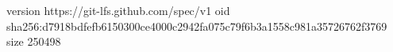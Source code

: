 version https://git-lfs.github.com/spec/v1
oid sha256:d7918bdfefb6150300ce4000c2942fa075c79f6b3a1558c981a35726762f3769
size 250498

